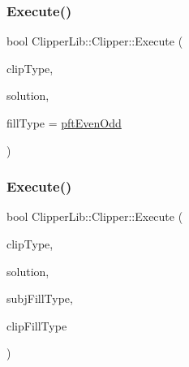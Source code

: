 \subsubsection{\texorpdfstring{Execute()}{Execute()}\hspace{0.1cm}{\footnotesize\ttfamily [1/4]}}
{\footnotesize\ttfamily bool Clipper\+Lib\+::\+Clipper\+::\+Execute (\begin{DoxyParamCaption}\item[{\mbox{\hyperlink{namespace_clipper_lib_a3db4fddd50b81ba657107505821d7f46}{Clip\+Type}}}]{clip\+Type,  }\item[{\mbox{\hyperlink{namespace_clipper_lib_a4bab1d9e10805fa6f1fd3b78c56efcfe}{Paths}} \&}]{solution,  }\item[{\mbox{\hyperlink{namespace_clipper_lib_a95a41ff8fa6b351d304829c267d638d7}{Poly\+Fill\+Type}}}]{fill\+Type = {\ttfamily \mbox{\hyperlink{namespace_clipper_lib_a95a41ff8fa6b351d304829c267d638d7acede4475518a377720537448c7b2df73}{pft\+Even\+Odd}}} }\end{DoxyParamCaption})}

\mbox{\label{class_clipper_lib_1_1_clipper_a3493f37ce691ab5a408fce12007cdcb8}} 
\subsubsection{\texorpdfstring{Execute()}{Execute()}\hspace{0.1cm}{\footnotesize\ttfamily [2/4]}}
{\footnotesize\ttfamily bool Clipper\+Lib\+::\+Clipper\+::\+Execute (\begin{DoxyParamCaption}\item[{\mbox{\hyperlink{namespace_clipper_lib_a3db4fddd50b81ba657107505821d7f46}{Clip\+Type}}}]{clip\+Type,  }\item[{\mbox{\hyperlink{namespace_clipper_lib_a4bab1d9e10805fa6f1fd3b78c56efcfe}{Paths}} \&}]{solution,  }\item[{\mbox{\hyperlink{namespace_clipper_lib_a95a41ff8fa6b351d304829c267d638d7}{Poly\+Fill\+Type}}}]{subj\+Fill\+Type,  }\item[{\mbox{\hyperlink{namespace_clipper_lib_a95a41ff8fa6b351d304829c267d638d7}{Poly\+Fill\+Type}}}]{clip\+Fill\+Type }\end{DoxyParamCaption})}

\mbox{\label{class_clipper_lib_1_1_clipper_aa7fc3415e002246298532b3739464d3c}} 
